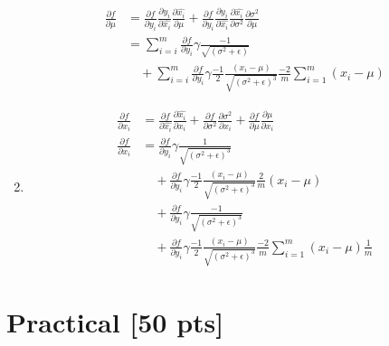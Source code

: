 \documentclass{article}
\begin{document}
\begin{enumerate}[label=\alph*.]
    \begin{equation*}
        \begin{aligned}
            \frac{\partial f}{\partial \mu} &= \frac{\partial f}{\partial y_i} \frac{\partial y_i}{\partial \widehat{x_i}} \frac{\partial \widehat{x_i}}{\partial \mu} + \frac{\partial f}{\partial y_i} \frac{\partial y_i}{\partial \widehat{x_i}} \frac{\partial \widehat{x_i}}{\partial \sigma^2} \frac{\partial \sigma^2}{\partial \mu} \\
            &= \sum_{i=i}^{m}\frac{\partial f}{\partial y_i} \gamma \frac{-1}{\sqrt{(\sigma^2+\epsilon)}} \\
            &\quad+ \sum_{i=i}^{m}\frac{\partial f}{\partial y_i} \gamma \frac{-1}{2} \frac{(x_i-\mu)}{\sqrt{(\sigma^2 + \epsilon)^3}} \frac{-2}{m} \sum_{i=1}^{m}(x_i - \mu) 
        \end{aligned}
    \end{equation*}  
    \item
    \begin{equation*}
        \begin{aligned}
            \frac{\partial f}{\partial x_i} &= \frac{\partial f}{\partial \widehat{x_i}} \frac{\partial \widehat{x_i}}{\partial x_i} + \frac{\partial f}{\partial \sigma^2} \frac{\partial \sigma^2}{\partial x_i} + \frac{\partial f}{\partial \mu} \frac{\partial \mu}{\partial x_i} \\
            \frac{\partial f}{\partial x_i} &= \frac{\partial f}{\partial y_i} \gamma \frac{1}{\sqrt{(\sigma^2+\epsilon)^3}} \\
            &\quad+ \frac{\partial f}{\partial y_i} \gamma \frac{-1}{2} \frac{(x_i-\mu)}{\sqrt{(\sigma^2 + \epsilon)^3}} \frac{2}{m}(x_i-\mu) \\
            &\quad+ \frac{\partial f}{\partial y_i} \gamma \frac{-1}{\sqrt{(\sigma^2+\epsilon)^3}} \\
            &\quad+ \frac{\partial f}{\partial y_i} \gamma \frac{-1}{2} \frac{(x_i-\mu)}{\sqrt{(\sigma^2 + \epsilon)^3}} \frac{-2}{m} \sum_{i=1}^{m}(x_i - \mu) \frac{1}{m}
        \end{aligned}
    \end{equation*}
\end{enumerate}

\section{Practical [50 pts]}
\end{document}
